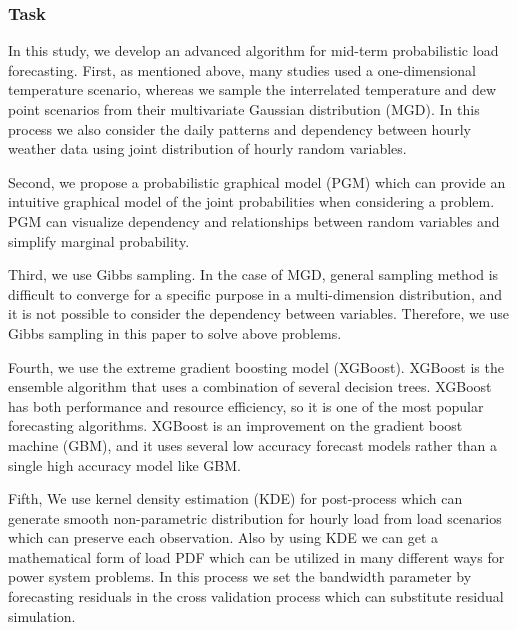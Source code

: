 \documentclass[journal]{IEEEtran} %
\begin{document}




















\subsubsection{Task}
In this study, we develop an advanced algorithm for mid-term probabilistic load forecasting. First, as mentioned above, many studies used a one-dimensional temperature scenario, whereas we sample the interrelated temperature and dew point  scenarios from their multivariate Gaussian distribution (MGD). In this process we also consider the daily patterns and dependency between hourly weather data using joint distribution of hourly random variables. %

Second, we propose a probabilistic graphical model (PGM) which can provide an intuitive graphical model of the joint probabilities when considering a problem. PGM can visualize dependency and relationships between random variables and simplify marginal probability.

Third, we use Gibbs sampling. In the case of MGD, general sampling method is difficult to converge for a specific purpose in a multi-dimension distribution, and it is not possible to consider the dependency between variables. Therefore, we use Gibbs sampling in this paper to solve above problems.

Fourth, we use the extreme gradient boosting model (XGBoost). XGBoost is the ensemble algorithm that uses a combination of several decision trees. XGBoost has both performance and resource efficiency, so it is one of the most popular forecasting algorithms. XGBoost is an improvement on the gradient boost machine (GBM), and it uses several low accuracy forecast models rather than a single high accuracy model like GBM.   

Fifth, We use kernel density estimation (KDE) for post-process which can generate smooth non-parametric distribution for hourly load from load scenarios which can preserve each observation. Also by using KDE we can get a mathematical form of load PDF which can be utilized in many different ways for power system problems. In this process we set the bandwidth parameter by forecasting residuals in the cross validation process which can substitute residual simulation.
\end{document}
